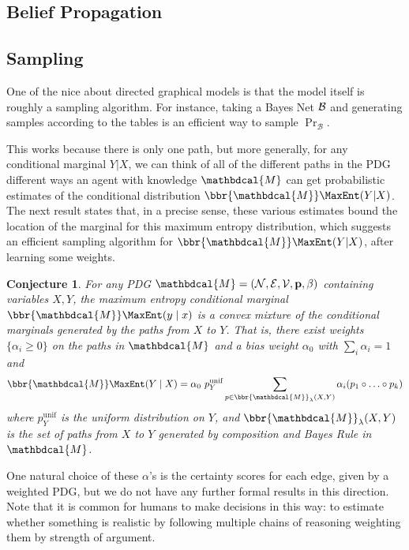 \documentclass[letterpaper]{article} %
\theoremstyle{plain}
\newtheorem{conj}[theorem]{Conjecture}
\theoremstyle{definition}
\theoremstyle{remark}
\newcommand\mat[1]{\mathbf{#1}}
\newcommand{\V}{\mathcal V}
\newcommand{\N}{\mathcal N}
\newcommand{\Ed}{\mathcal E}
\newcommand{\pdgvars}[1][]{(\N#1, \Ed#1, \V#1, \mat p#1, \beta#1)}
\newcommand{\dg}[1]{\mathbdcal{#1}}
\begin{document}
{\begin{vfull}
	\subsection{Belief Propagation}
	
	
	\subsection{Sampling}
	
	One of the nice about directed graphical models is that the model itself is roughly a sampling algorithm. For instance, taking a Bayes Net $\cal B$ and generating samples according to the tables is an efficient way to sample $\Pr_{\mathcal B}$.

	This works because there is only one path, but more generally, for any conditional marginal $Y|X$, we can think of all of the different paths in the PDG different ways an agent with knowledge $\dg M$ can get probabilistic estimates of the conditional distribution $\bbr{\dg M}\MaxEnt(Y | X)$. The next result states that, in a precise sense, these various estimates bound the location of the marginal for this maximum entropy distribution, which suggests an efficient sampling algorithm for $\bbr{\dg M}\MaxEnt(Y | X)$, after learning some weights.
	
	\begin{conj}\label{thm:maxent-hull}
		For any PDG $\dg M = \pdgvars[]$ containing variables $X, Y$, the maximum entropy conditional marginal $\bbr{\dg M}\MaxEnt(y \mid x)$ is a convex mixture of the conditional marginals generated by the paths from $X$ to $Y$.  That is, there exist weights $\{\alpha_i \geq 0\}$ on the paths in $\dg M$ and a bias weight $\alpha_0$ with $\sum_i {\alpha_i} = 1$ and
		\[ \bbr{\dg M}\MaxEnt(Y \mid X) = \alpha_0 \  p^{\text{unif}}_Y \sum_{p \in \bbr{\dg M}_\lambda(X, Y)} \alpha_i (p_1 \circ \ldots \circ p_k) \]
		where $p^{\text{unif}}_Y$ is the uniform distribution on $Y$, and $\bbr{\dg M}_\lambda(X,Y)$ is the set of paths from $X$ to $Y$ generated by composition and Bayes Rule in $\dg M$. 
	\end{conj}

	One natural choice of these $\alpha$'s is the certainty scores for each edge, given by a weighted PDG, but we do not have any further formal results in this direction.
	Note that it is common for humans to make decisions in this way: to estimate whether something is realistic by following multiple chains of reasoning weighting them by strength of argument.
	
	\end{vfull}
}
\end{document}
